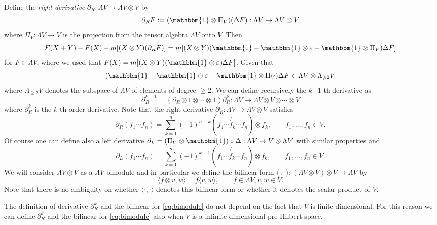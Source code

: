 \documentclass{article}
\newcommand{\assign}{:=}
\newcommand{\tmtextit}[1]{{\itshape{#1}}}
\begin{document}
Define the \tmtextit{right derivative} $\partial_R : \Lambda V \rightarrow
\Lambda V \otimes V$ by
\begin{equation}
  \partial_R F \assign (\mathbbm{1} \otimes \Pi_V) (\Delta F) : \Lambda V
  \rightarrow \Lambda V \otimes V \label{eq:derivativeR}
\end{equation}
where $\Pi_V : \Lambda V \rightarrow V$ is the projection from the tensor
algebra $\Lambda V$ onto $V$. Then
\[ F (X + Y) - F (X) - m [(X \otimes Y) (\partial_R F)] = m [(X \otimes Y)
   (\mathbbm{1}-\mathbbm{1} \otimes \varepsilon -\mathbbm{1} \otimes \Pi_V)
   \Delta F] \]
for $F \in \Lambda V$, where we used that $F (X) = m [(X \otimes Y)
(\mathbbm{1} \otimes \varepsilon) \Delta F]$. Given that
\[ (\mathbbm{1}-\mathbbm{1} \otimes \varepsilon -\mathbbm{1} \otimes \Pi_V)
   \Delta F \in \Lambda V \otimes \Lambda_{\geqslant 2} V \]
where $\Lambda_{\geqslant 2} V$ denotes the subspace of $\Lambda V$ of
elements of degree $\geqslant 2$. We can define recursively the $k$+1-th
derivative as
\[ \partial_R^{k + 1} = (\partial_R \otimes 1 \otimes \cdots \otimes 1)
   \partial_R^k : \Lambda V \rightarrow \Lambda V \otimes V \otimes \cdots
   \otimes V \]
where $\partial_R^k$ is the $k$-th order derivative. Note that the right
derivative $\partial_R : \Lambda V \rightarrow \Lambda V \otimes V$ satisfies
\[ \partial_R (f_1 \cdots f_n) = \sum_{k = 1}^n (- 1)^{n - k} \left( f_1
   \cdots \not{f_k} \cdots f_n \right) \otimes f_k, \qquad f_1, \ldots, f_n
   \in V. \]
Of course one can define also a left derivative $\partial_L = (\Pi_V \otimes
\mathbbm{1}) \circ \Delta : \Lambda V \rightarrow V \otimes \Lambda V$ with
similar properties and
\[ \partial_L (f_1 \cdots f_n) = \sum_{k = 1}^n (- 1)^{k - 1} \left( f_1
   \cdots \not{f_k} \cdots f_n \right) \otimes f_k, \qquad f_1, \ldots, f_n
   \in V. \]
We will consider $\Lambda V \otimes V$ as a $\Lambda V$-bimodule and in
particular we define the bilinear form $\langle \cdot, \cdot \rangle :
(\Lambda V \otimes V) \otimes V \rightarrow \Lambda V$ by
\begin{equation}
  \langle f \otimes v, w \rangle = f \langle v, w \rangle, \qquad f \in
  \Lambda V, v, w \in V. \label{eq:bimodule}
\end{equation}
Note that there is no ambiguity on whether $\langle \cdot, \cdot \rangle$
denotes this bilinear form or whether it denotes the scalar product of $V$.

\begin{remark}
  \label{remark_infinitederivative}The definition of derivative $\partial_R^k$
  and the bilinear for {\eqref{eq:bimodule}} do not depend on the fact that
  $V$ is finite dimensional. For this reason we can define $\partial_R^k$ and
  the bilinear for {\eqref{eq:bimodule}} also when $V$ is a infinite
  dimensional pre-Hilbert space.
\end{remark}
\end{document}
